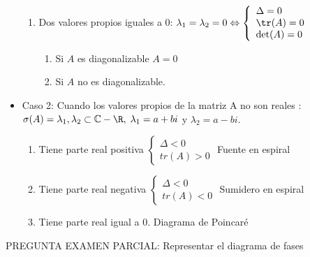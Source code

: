 \begin{itemize}
\begin{enumerate}
\item Dos valores propios iguales a 0: $\lambda_1=\lambda_2=0 \Leftrightarrow \left\{ \begin{array}{ll}\Delta=0 \\ \tr(A)=0 \\ \det(A)=0\end{array}\right.$
\begin{enumerate}
\item Si $A$ es diagonalizable $A=0$
\item Si $A$ no es diagonalizable.
\end{enumerate}
\end{enumerate}
\item Caso 2: Cuando los valores propios de la matriz A no son reales : $\sigma(A)={\lambda_1,\lambda_2}\subset \mathbb{C} - \R, \; \lambda_1=a+bi$ y $ \lambda_2=a-bi$.
\begin{enumerate}
\item Tiene parte real positiva $\left\{\begin{array}{ll} \Delta < 0 \\ tr(A) > 0 \end{array}\right.$ Fuente en espiral
\item Tiene parte real negativa $\left\{\begin{array}{ll} \Delta < 0 \\ tr(A) < 0 \end{array}\right.$ Sumidero en espiral
\item Tiene parte real igual a 0. Diagrama de Poincaré
\end{enumerate}
\end{itemize}


\begin{ejemplo}
\end{ejemplo}

PREGUNTA EXAMEN PARCIAL: Representar el diagrama de fases


